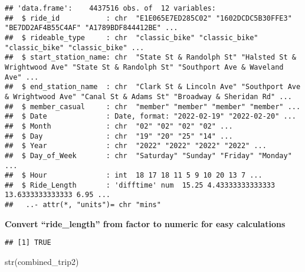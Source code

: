 \documentclass[
]{article}
\newenvironment{Shaded}{\begin{snugshade}}{\end{snugshade}}
\newcommand{\FunctionTok}[1]{\textcolor[rgb]{0.00,0.00,0.00}{#1}}
\newcommand{\NormalTok}[1]{#1}
\newcommand{\OtherTok}[1]{\textcolor[rgb]{0.56,0.35,0.01}{#1}}
\newcommand{\SpecialCharTok}[1]{\textcolor[rgb]{0.00,0.00,0.00}{#1}}
\begin{document}
\begin{verbatim}
## 'data.frame':    4437516 obs. of  12 variables:
##  $ ride_id           : chr  "E1E065E7ED285C02" "1602DCDC5B30FFE3" "BE7DD2AF4B55C4AF" "A1789BDF844412BE" ...
##  $ rideable_type     : chr  "classic_bike" "classic_bike" "classic_bike" "classic_bike" ...
##  $ start_station_name: chr  "State St & Randolph St" "Halsted St & Wrightwood Ave" "State St & Randolph St" "Southport Ave & Waveland Ave" ...
##  $ end_station_name  : chr  "Clark St & Lincoln Ave" "Southport Ave & Wrightwood Ave" "Canal St & Adams St" "Broadway & Sheridan Rd" ...
##  $ member_casual     : chr  "member" "member" "member" "member" ...
##  $ Date              : Date, format: "2022-02-19" "2022-02-20" ...
##  $ Month             : chr  "02" "02" "02" "02" ...
##  $ Day               : chr  "19" "20" "25" "14" ...
##  $ Year              : chr  "2022" "2022" "2022" "2022" ...
##  $ Day_of_Week       : chr  "Saturday" "Sunday" "Friday" "Monday" ...
##  $ Hour              : int  18 17 18 11 5 9 10 20 13 7 ...
##  $ Ride_Length       : 'difftime' num  15.25 4.43333333333333 13.6333333333333 6.95 ...
##   ..- attr(*, "units")= chr "mins"
\end{verbatim}

\textbf{Convert ``ride\_length'' from factor to numeric for easy
calculations}

\begin{Shaded}
\end{Shaded}

\begin{verbatim}
## [1] TRUE
\end{verbatim}

\begin{Shaded}
\begin{Highlighting}[]
\FunctionTok{str}\NormalTok{(combined\_trip2)}
\end{Highlighting}
\end{Shaded}
\end{document}

